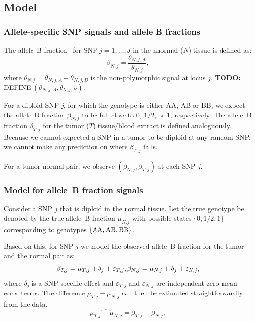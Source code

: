 \documentclass[draft]{bioinfo}
\newcommand{\gAA}{\textnormal{AA}\xspace}
\newcommand{\gAB}{\textnormal{AB}\xspace}
\newcommand{\gBB}{\textnormal{BB}\xspace}
\newcommand{\eps}{\varepsilon\xspace}
\newenvironment{TODO}{\color{red}\textbf{TODO:}}{}
\begin{document}
\begin{methods}
\subsection{Model}
\label{Model}

\subsubsection{Allele-specific SNP signals and allele B fractions}
The allele~B fraction~\cite{PeifferD_etal_2006} for SNP $j=1,\ldots,J$ in the nnormal ($N$) tissue is defined as:
\begin{equation}
  \beta_{N,j} = \frac{\theta_{N,j,A}}{\theta_{N,j}},
  \label{eqnCnLogRatio}
\end{equation}
where $\theta_{N,j} = \theta_{N,j,A} + \theta_{N,j,B}$ is the non-polymorphic signal at locus $j$.
\begin{TODO}
  DEFINE $(\theta_{N,j,A}, \theta_{N,j,B})$.
\end{TODO}

For a diploid SNP $j$, for which the genotype is either AA, AB or BB, we expect the allele~B fraction $\beta_{N,j}$ to be fall close to $0$, $1/2$, or $1$, respectively.
The allele~B fraction $\beta_{T,j}$ for the tumor ($T$) tissue/blood extract is defined analoguously. Because we cannot expected a SNP in a tumor to be diploid at any random SNP, we cannot make any prediction on where $\beta_{T,j}$ falls.

For a tumor-normal pair, we observe $(\beta_{N,j}, \beta_{T,j})$ at each SNP $j$.

\subsubsection{Model for allele~B fraction signals}
Consider a SNP $j$ that is diploid in the normal tissue.  
Let the true genotype be denoted by the true allele~B fraction $\mu_{N,j}$ with possible states $\{0,1/2,1\}$ corresponding to genotypes $\{\gAA,\gAB,\gBB\}$.

Based on this, for SNP $j$ we model the observed allele~B fraction for the tumor and the normal pair as:
\begin{equation}
  \beta_{T,j} = \mu_{T,j} + \delta_{j} + \eps_{T,j},\\
  \beta_{N,j} = \mu_{N,j} + \delta_{j} + \eps_{N,j},
  \label{eqnFracBModel}
\end{equation}
where $\delta_{j}$ is a SNP-specific effect and $\eps_{T,j}$ and $\eps_{N,j}$ are independent zero-mean error terms. The difference $\mu_{T,j}-\mu_{N,j}$ can then be estimated straightforwardly from the data.
\begin{equation}
  \widehat{\mu_{T,j}-\mu_{N,j}} = \beta_{T,j} - \beta_{N,j},
  \label{eqnTumorBoostEstimate}
\end{equation}


\end{methods}
\end{document}
